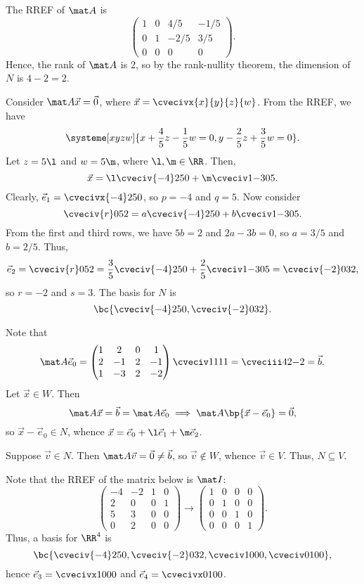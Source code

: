 \begin{solution}
    \begin{ppart}
        The RREF of $\mat A$ is \[\begin{pmatrix}1 & 0 & 4/5 & -1/5 \\ 0 & 1 & -2/5 & 3/5 \\ 0 & 0 & 0 & 0\end{pmatrix}.\] Hence, the rank of $\mat A$ is 2, so by the rank-nullity theorem, the dimension of $N$ is $4 - 2 = 2$.
    \end{ppart}
    \begin{ppart}
        Consider $\mat A \vec x = \vec 0$, where $\vec x = \cvecivx{x}{y}{z}{w}$. From the RREF, we have \[\systeme[xyzw]{x + \frac45 z - \frac15 w = 0, y - \frac25 z + \frac35 w = 0}.\] Let $z = 5\l$ and $w = 5\m$, where $\l, \m \in \RR$. Then, \[\vec x = \l \cveciv{-4}250 + \m \cveciv1{-3}05.\] Clearly, $\vec e_1 = \cvecivx{-4}250$, so $p = -4$ and $q = 5$. Now consider \[\cveciv{r}052 = a \cveciv{-4}250 + b\cveciv1{-3}05.\] From the first and third rows, we have $5b = 2$ and $2a - 3b = 0$, so $a = 3/5$ and $b = 2/5$. Thus, \[\vec e_2 = \cveciv{r}052 = \frac35 \cveciv{-4}250 + \frac25 \cveciv1{-3}05 = \cveciv{-2}032,\] so $r = -2$ and $s = 3$. The basis for $N$ is \[\bc{\cveciv{-4}250, \cveciv{-2}032}.\]
    \end{ppart}
    \begin{ppart}
        Note that \[\mat A \vec e_0 = \begin{pmatrix}1 & 2 & 0 & 1 \\ 2 & -1 & 2 & -1 \\ 1 & -3 & 2 & -2\end{pmatrix} \cveciv1111 = \cveciii42{-2} = \vec b.\] Let $\vec x \in W$. Then \[\mat A \vec x = \vec b = \mat A \vec e_0 \implies \mat A \bp{\vec x - \vec e_0} = \vec 0,\] so $\vec x - \vec e_0 \in N$, whence $\vec x = \vec e_0 + \l \vec e_1 + \m \vec e_2$.
    \end{ppart}
    \begin{ppart}
        Suppose $\vec v \in N$. Then $\mat A \vec v = \vec 0 \neq \vec b$, so $\vec v \notin W$, whence $\vec v \in V$. Thus, $N \subseteq V$.
    \end{ppart}
    \begin{ppart}
        Note that the RREF of the matrix below is $\mat I$: \[\begin{pmatrix}-4 & -2 & 1 & 0 \\ 2 & 0 & 0 & 1 \\ 5 & 3 & 0 & 0 \\ 0 & 2 & 0 & 0\end{pmatrix} \rightarrow \begin{pmatrix}1 & 0 & 0 & 0 \\ 0 & 1 & 0 & 0 \\ 0 & 0 & 1 & 0 \\ 0 & 0 & 0 & 1\end{pmatrix}.\] Thus, a basis for $\RR^4$ is \[\bc{\cveciv{-4}250, \cveciv{-2}032, \cveciv1000, \cveciv0100},\] hence $\vec e_3 = \cvecivx1000$ and $\vec e_4 = \cvecivx0100$.
    \end{ppart}
\end{solution}

